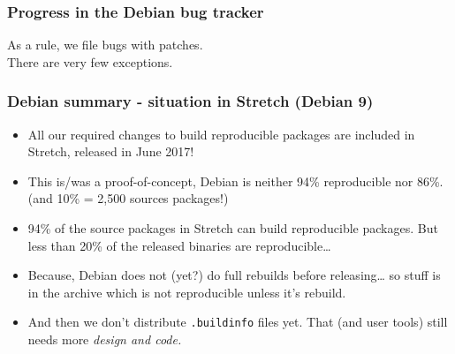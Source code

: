 \documentclass[14pt,aspectratio=169]{beamer}
\begin{document}
\begin{frame}
 \frametitle{Progress in the Debian bug tracker}
 \begin{center}
  \footnotesize{As a rule, we file bugs with patches. \\
  There are very few exceptions.}
  \vfill
 \end{center}
\end{frame}



\begin{frame}
	\frametitle{Debian summary - situation in Stretch (Debian 9)}
 \begin{itemize}
   \item All our required changes to build reproducible packages are included in Stretch, released in June 2017!
 \item<2-4> This is/was a proof-of-concept, Debian is neither 94\% reproducible nor
  86\%. (and 10\% = 2,500 sources packages!)
  \item<3-4> 94\% of the source packages in Stretch can build reproducible packages. But less than 20\% of the released binaries are reproducible…
  \item<3-4> Because, Debian does not (yet?) do full rebuilds before
  releasing… so stuff is in the archive which is not reproducible unless it's
  rebuild.
  \item<4> And then we don't distribute \texttt{.buildinfo} files yet.
   That (and user tools) still needs more \it{design} and code.
 \end{itemize}
\end{frame}
\end{document}
